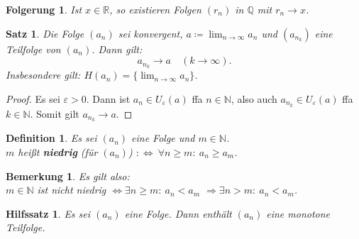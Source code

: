 \documentclass[12pt]{extreport} %
\newcommand{\N}{\mathbb{N}}
\newcommand{\Q}{\mathbb{Q}}
\newcommand{\R}{\mathbb{R}}
\theoremstyle{named}
\theoremstyle{itshape}
\newtheorem{satz}[unnamedtheorem]{Satz}
\newtheorem*{definition}{Definition}
\newtheorem{hilfssatz}[unnamedtheorem]{Hilfssatz}
\theoremstyle{normal}
\newtheorem*{bemerkung}{Bemerkung}
\newtheorem*{folgerung*}{Folgerung}
\begin{document}
\begin{folgerung*}
Ist $x \in \R$, so existieren Folgen $(r_{n})$ in $\Q$ mit $r_{n} \rightarrow x$.	
\end{folgerung*}


\begin{satz} \label{2.11:satz} 
	Die Folge $(a_{n})$ sei konvergent, $a \coloneqq \lim_{n \to \infty} a_{n}$ und $(a_{n_{k}})$ eine Teilfolge von $(a_{n})$. Dann gilt:
	$$ a_{n_{k}} \rightarrow a \quad (k \rightarrow \infty). $$
	Insbesondere gilt: $H(a_{n}) = \{ \lim_{n \to \infty} a_{n} \}$.
\end{satz}

\begin{proof}
	Es sei $\varepsilon > 0$. Dann ist $a_{n} \in U_{\varepsilon}(a)$ ffa $n \in \N$, also auch $a_{n_{k}} \in U_{\varepsilon}(a)$ ffa $k \in \N$. Somit gilt 
	$a_{n_{k}} \rightarrow a$.
\end{proof}

\begin{definition} Es sei $(a_{n})$ eine Folge und $m \in \N$. \\
$m$ hei{\ss}t \textbf{niedrig} (für $(a_{n})$) $:\iff ~\forall n \geq m: ~  a_{n} \geq a_{m}$.		
\end{definition}

\begin{bemerkung}
Es gilt also: \\
$m \in \N$ ist nicht niedrig $\iff \exists n \geq m: ~ a_{n} < a_{m}$ $\Rightarrow \exists n > m: ~ a_{n} < a_{m}$.
\end{bemerkung}


\begin{hilfssatz} \label{HS2}
	Es sei $(a_{n})$ eine Folge. Dann enthält $(a_{n})$ eine monotone Teilfolge.	
\end{hilfssatz}
\end{document}
